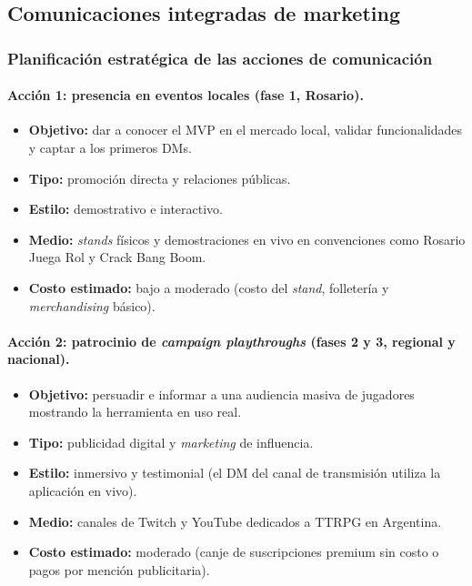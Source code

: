 \subsection{Comunicaciones integradas de marketing}

\subsubsection{Planificación estratégica de las acciones de comunicación}
\paragraph{Acción 1: presencia en eventos locales (fase 1, Rosario).}
\begin{itemize}
  \item \textbf{Objetivo:} dar a conocer el MVP en el mercado local, validar funcionalidades y captar a los primeros DMs.
  \item \textbf{Tipo:} promoción directa y relaciones públicas.
  \item \textbf{Estilo:} demostrativo e interactivo.
  \item \textbf{Medio:} \textit{stands} físicos y demostraciones en vivo en convenciones como Rosario Juega Rol y Crack Bang Boom.
  \item \textbf{Costo estimado:} bajo a moderado (costo del \textit{stand}, folletería y \textit{merchandising} básico).
\end{itemize}

\paragraph{Acción 2: patrocinio de \textit{campaign playthroughs} (fases 2 y 3, regional y nacional).}
\begin{itemize}
  \item \textbf{Objetivo:} persuadir e informar a una audiencia masiva de jugadores mostrando la herramienta en uso real.
  \item \textbf{Tipo:} publicidad digital y \textit{marketing} de influencia.
  \item \textbf{Estilo:} inmersivo y testimonial (el DM del canal de transmisión utiliza la aplicación en vivo).
  \item \textbf{Medio:} canales de Twitch y YouTube dedicados a TTRPG en Argentina.
  \item \textbf{Costo estimado:} moderado (canje de suscripciones premium sin costo o pagos por mención publicitaria).
\end{itemize}


